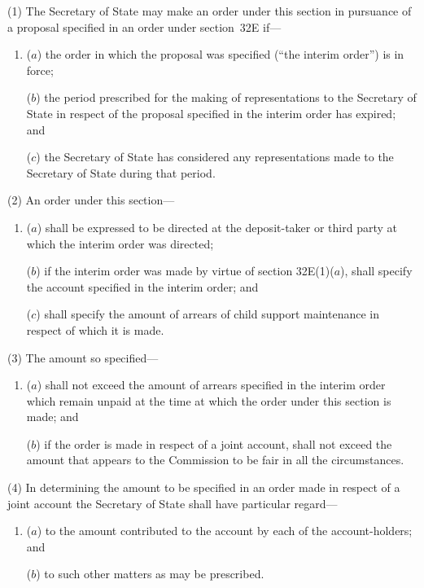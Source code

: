 \documentclass[12pt,a4paper]{article}
\begin{document}
(1) The 
Secretary of State  %
may make an order under this section in pursuance of a proposal specified in an order under section~32E if---
\begin{enumerate}\item[]
($a$)
the order in which the proposal was specified (“the interim order”) is in force;

($b$)
the period prescribed for the making of representations to the 
Secretary of State  %
in respect of the proposal specified in the interim order has expired; and

($c$)
the 
Secretary of State  %
has considered any representations made to 
the Secretary of State  %
during that period.
\end{enumerate}

(2) An order under this section---
\begin{enumerate}\item[]
($a$)
shall be expressed to be directed at the deposit-taker or third party at which the interim order was directed;

\begin{sloppypar}
($b$)
if the interim order was made by virtue of section 32E(1)($a$), shall specify the account specified in the interim order; and
\end{sloppypar}

($c$)
shall specify the amount of arrears of child support maintenance in respect of which it is made.
\end{enumerate}

(3) The amount so specified---
\begin{enumerate}\item[]
($a$) shall not exceed the amount of arrears specified in the interim order which remain unpaid at the time at which the order under this section is made; and

($b$) if the order is made in respect of a joint account, shall not exceed the amount that appears to the Commission to be fair in all the circumstances.
\end{enumerate}

(4)
In determining the amount to be specified in an order made in respect of a joint account the 
Secretary of State  %
shall have particular regard---
\begin{enumerate}\item[]
($a$) to the amount contributed to the account by each of the account-holders; and

($b$) to such other matters as may be prescribed.
\end{enumerate}
\end{document}
